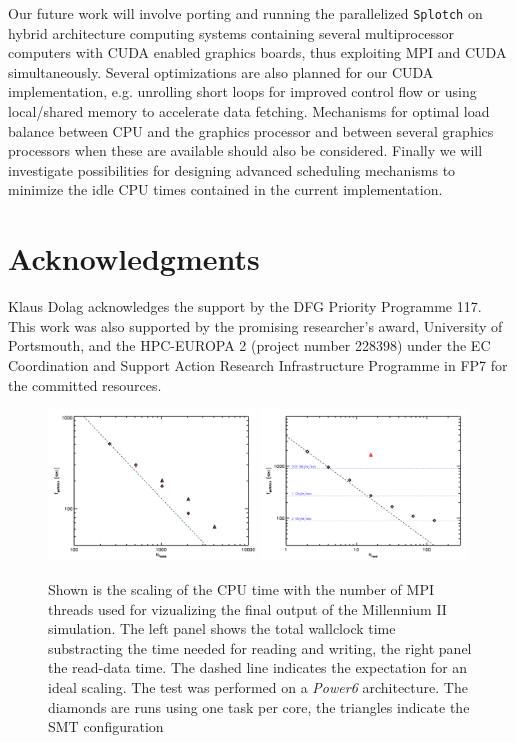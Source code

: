 Our future work will involve porting and running the parallelized {\tt Splotch} on hybrid 
architecture computing systems containing several multiprocessor computers with CUDA 
enabled graphics boards, thus exploiting MPI and CUDA simultaneously. 
Several optimizations are also planned for our CUDA implementation, e.g. unrolling 
short loops for improved control flow or using local/shared memory to accelerate data fetching. 
Mechanisms for optimal load balance between CPU and the graphics processor and between several 
graphics processors when these are available should also be considered. Finally we will 
investigate possibilities for designing advanced scheduling mechanisms to minimize 
the idle CPU times contained in the current implementation.

\section*{Acknowledgments}
Klaus Dolag acknowledges the support 
by the DFG Priority Programme 117. This work was also supported by the promising 
researcher's award, University of Portsmouth, and the HPC-EUROPA 2 (project number 228398) 
under the EC Coordination and Support Action Research Infrastructure Programme in FP7 
for the committed resources.

\begin{figure}
\begin{center}
\includegraphics[width=0.49\textwidth]{t_cpu.pdf}
\includegraphics[width=0.49\textwidth]{t_read.pdf}
\end{center}
\caption{Shown is the scaling of the CPU time with the number of MPI threads used 
for vizualizing the
final output of the Millennium II simulation. 
The left panel shows the total wallclock time substracting the time needed for 
reading and writing, the right panel the read-data time. 
The dashed line indicates the expectation for an ideal scaling. The test was 
performed on a {\it Power6} architecture. The diamonds are runs using one task per core, 
the triangles indicate the SMT configuration
}\label{cpu_scaling}
\end{figure}

